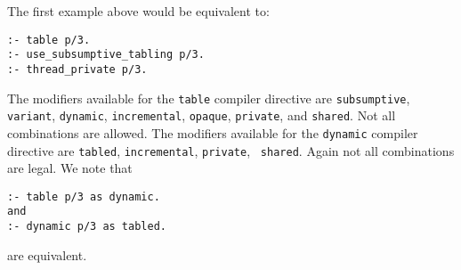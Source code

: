 The first example above would be equivalent to:

\begin{verbatim}
:- table p/3.
:- use_subsumptive_tabling p/3.
:- thread_private p/3.

\end{verbatim}

The modifiers available for the {\tt table} compiler directive are
{\tt subsumptive}, {\tt variant}, {\tt dynamic}, {\tt incremental},
{\tt opaque}, {\tt private}, and {\tt shared}.  Not all combinations
are allowed.  The modifiers available for the {\tt dynamic} compiler
directive are {\tt tabled}, {\tt incremental}, {\tt private}, {\tt
shared}.  Again not all combinations are legal.  We note that
\begin{verbatim}
:- table p/3 as dynamic.
and
:- dynamic p/3 as tabled.
\end{verbatim}
are equivalent.
